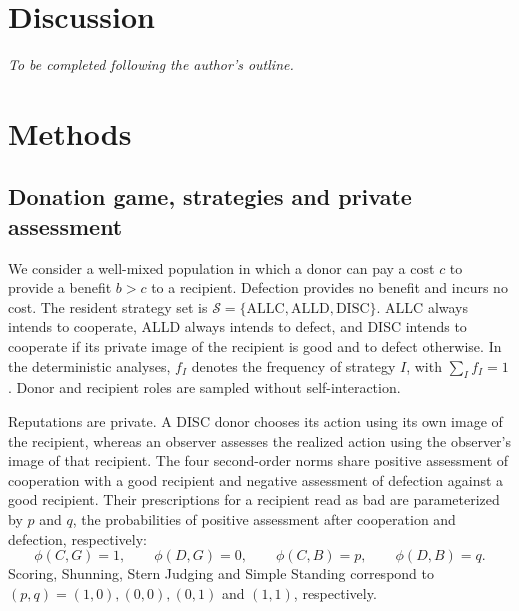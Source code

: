 \documentclass[fleqn,10pt]{article}
\begin{document}
\section*{Discussion}
\textit{To be completed following the author's outline.}
\section*{Methods}
\label{sec:methods}

\subsection*{Donation game, strategies and private assessment}

We consider a well-mixed population in which a donor can pay a cost $c$ to provide a benefit $b>c$ to a recipient. Defection provides no benefit and incurs no cost. The resident strategy set is $\mathcal S=\{\mathrm{ALLC},\mathrm{ALLD},\mathrm{DISC}\}$. ALLC always intends to cooperate, ALLD always intends to defect, and DISC intends to cooperate if its private image of the recipient is good and to defect otherwise. In the deterministic analyses, $f_I$ denotes the frequency of strategy $I$, with $\sum_I f_I=1$. Donor and recipient roles are sampled without self-interaction.

Reputations are private. A DISC donor chooses its action using its own image of the recipient, whereas an observer assesses the realized action using the observer's image of that recipient. The four second-order norms share positive assessment of cooperation with a good recipient and negative assessment of defection against a good recipient. Their prescriptions for a recipient read as bad are parameterized by $p$ and $q$, the probabilities of positive assessment after cooperation and defection, respectively:
\begin{equation}
\phi(C,G)=1,\qquad \phi(D,G)=0,\qquad
\phi(C,B)=p,\qquad \phi(D,B)=q.
\label{eq:methods-norm}
\end{equation}
Scoring, Shunning, Stern Judging and Simple Standing correspond to $(p,q)=(1,0),(0,0),(0,1)$ and $(1,1)$, respectively.
\end{document}
